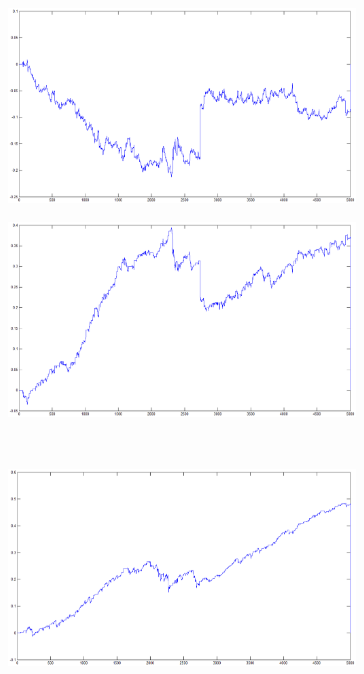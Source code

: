 \documentclass{tewiart}
\begin{document}
\FloatBarrier
\begin{figure}[h]
\centering
\begin{minipage}{.49\linewidth}
\centering
\includegraphics[width=0.82\textwidth]{images/gbpchfA.eps}
\label{jedno}
\end{minipage}
\begin{minipage}{.49\linewidth}
\centering
\includegraphics[width=0.82\textwidth]{images/gbpchfB.eps}
\label{dwu}
\end{minipage}
\\
\begin{minipage}{.49\linewidth}
\centering
\includegraphics[width=0.82\textwidth]{images/gbpchfC.eps}
\label{cztero}
\end{minipage}

\end{figure}
\end{document}
